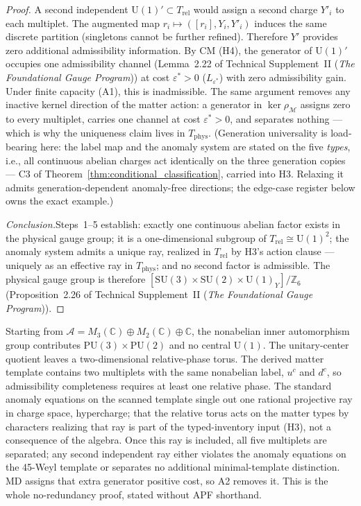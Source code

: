\documentclass[11pt]{article}
\theoremstyle{definition}
\newcommand{\SU}{\mathrm{SU}}
\newcommand{\U}{\mathrm{U}}
\newcommand{\TSII}{Technical Supplement~II (\emph{The Foundational Gauge Program})}
\begin{document}
\begin{proof}
A second independent $\U(1)' \subset T_{\mathrm{rel}}$ would assign
a second charge $Y'_i$ to each multiplet.  The augmented map
$r_i \mapsto ([r_i], Y_i, Y'_i)$ induces the same discrete
partition (singletons cannot be further refined).  Therefore $Y'$
provides zero additional admissibility information.  By CM (H4), the
generator of $\U(1)'$ occupies one admissibility channel
(Lemma~2.22 of \TSII{}) at cost $\varepsilon^* > 0$
($L_{\varepsilon^*}$) with zero admissibility gain.  Under finite
capacity (A1), this is inadmissible.  The same argument removes any
inactive kernel direction of the matter action: a generator in
$\ker\rho_{\mathcal{M}}$ assigns zero to every multiplet, carries
one channel at cost $\varepsilon^* > 0$, and separates nothing ---
which is why the uniqueness claim lives in $T_{\mathrm{phys}}$.
(Generation universality is
load-bearing here: the label map and the anomaly system are stated on
the five \emph{types}, i.e., all continuous abelian charges act
identically on the three generation copies --- C3 of
Theorem~\ref{thm:conditional_classification}, carried into H3.
Relaxing it admits generation-dependent anomaly-free directions; the
edge-case register below owns the exact example.)

\textit{Conclusion.}\quad Steps~1--5 establish: exactly one
continuous abelian factor exists in the physical gauge group; it is a
one-dimensional subgroup of $T_{\mathrm{rel}} \cong \mathrm{U}(1)^2$;
the anomaly system admits a unique ray, realized in
$T_{\mathrm{rel}}$ by H3's action clause --- uniquely as an effective
ray in $T_{\mathrm{phys}}$; and no second factor is
admissible.  The physical gauge group is therefore
$[\SU(3) \times \SU(2) \times \U(1)_Y] / \mathbb{Z}_6$
(Proposition~2.26 of \TSII{}).
\end{proof}

\begin{tcolorbox}[apfbox, title={Unique $\U(1)$ proof in conventional language}]
\footnotesize
Starting from $\mathcal A=M_3(\mathbb C)\oplus M_2(\mathbb C)\oplus\mathbb C$, the nonabelian inner automorphism group contributes $\mathrm{PU}(3)\times\mathrm{PU}(2)$ and no central $\U(1)$.  The unitary-center quotient leaves a two-dimensional relative-phase torus.  The derived matter template contains two multiplets with the same nonabelian label, $u^c$ and $d^c$, so admissibility completeness requires at least one relative phase.  The standard anomaly equations on the scanned template single out one rational projective ray in charge space, hypercharge; that the relative torus acts on the matter types by characters realizing that ray is part of the typed-inventory input (H3), not a consequence of the algebra.  Once this ray is included, all five multiplets are separated; any second independent ray either violates the anomaly equations on the 45-Weyl template or separates no additional minimal-template distinction.  MD assigns that extra generator positive cost, so A2 removes it.  This is the whole no-redundancy proof, stated without APF shorthand.
\end{tcolorbox}
\end{document}

